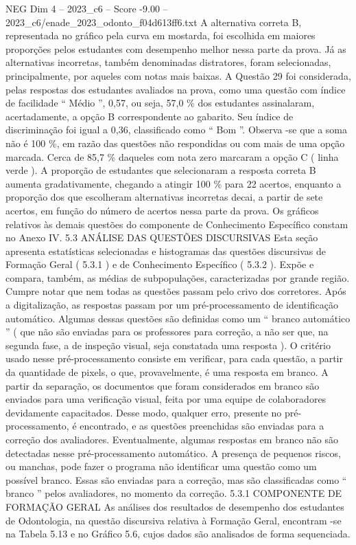 \begin{textsample}{NEG Dim 4 – 2023\_c6 – Score -9.00 – 2023\_c6/enade\_2023\_odonto\_f04d613ff6.txt}
A alternativa correta B, representada no gráfico pela curva em mostarda, foi escolhida em maiores proporções pelos estudantes com desempenho melhor nessa parte da prova.
Já as alternativas incorretas, também denominadas distratores, foram selecionadas, principalmente, por aqueles com notas mais baixas.
A Questão 29 foi considerada, pelas respostas dos estudantes avaliados na prova, como uma questão com índice de facilidade “ Médio ”, 0,57, ou seja, 57,0 \% dos estudantes assinalaram, acertadamente, a opção B correspondente ao gabarito.
Seu índice de discriminação foi igual a 0,36, classificado como “ Bom ”.
Observa -se que a soma não é 100 \%, em razão das questões não respondidas ou com mais de uma opção marcada.
Cerca de 85,7 \% daqueles com nota zero marcaram a opção C ( linha verde ).
A proporção de estudantes que selecionaram a resposta correta B aumenta gradativamente, chegando a atingir 100 \% para 22 acertos, enquanto a proporção dos que escolheram alternativas incorretas decai, a partir de sete acertos, em função do número de acertos nessa parte da prova.
Os gráficos relativos às demais questões do componente de Conhecimento Específico constam no Anexo IV. 5.3 ANÁLISE DAS QUESTÕES DISCURSIVAS Esta seção apresenta estatísticas selecionadas e histogramas das questões discursivas de Formação Geral ( 5.3.1 ) e de Conhecimento Específico ( 5.3.2 ).
Expõe e compara, também, as médias de subpopulações, caracterizadas por grande região.
Cumpre notar que nem todas as questões passam pelo crivo dos corretores.
Após a digitalização, as respostas passam por um pré-processamento de identificação automático.
Algumas dessas questões são definidas como um “ branco automático ” ( que não são enviadas para os professores para correção, a não ser que, na segunda fase, a de inspeção visual, seja constatada uma resposta ).
O critério usado nesse pré-processamento consiste em verificar, para cada questão, a partir da quantidade de pixels, o que, provavelmente, é uma resposta em branco.
A partir da separação, os documentos que foram considerados em branco são enviados para uma verificação visual, feita por uma equipe de colaboradores devidamente capacitados.
Desse modo, qualquer erro, presente no pré-processamento, é encontrado, e as questões preenchidas são enviadas para a correção dos avaliadores.
Eventualmente, algumas respostas em branco não são detectadas nesse pré-processamento automático.
A presença de pequenos riscos, ou manchas, pode fazer o programa não identificar uma questão como um possível branco.
Essas são enviadas para a correção, mas são classificadas como “ branco ” pelos avaliadores, no momento da correção. 5.3.1 COMPONENTE DE FORMAÇÃO GERAL As análises dos resultados de desempenho dos estudantes de Odontologia, na questão discursiva relativa à Formação Geral, encontram -se na Tabela 5.13 e no Gráfico 5.6, cujos dados são analisados de forma sequenciada.

\end{textsample}
